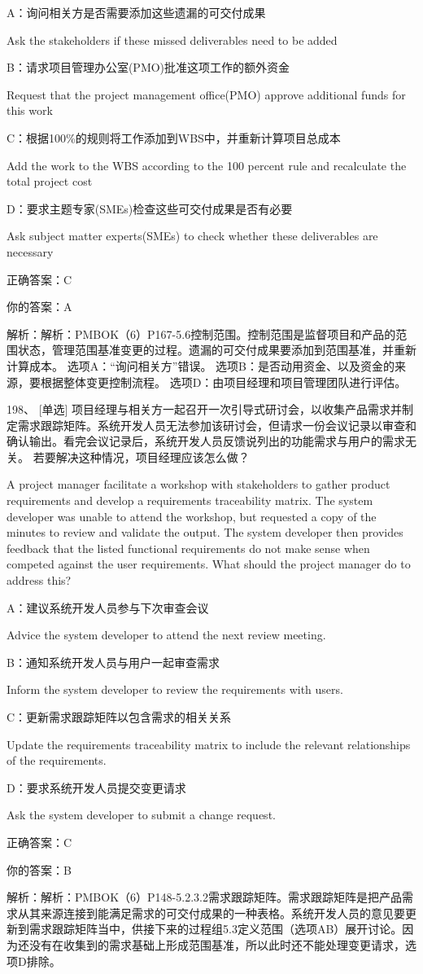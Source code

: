 A：询问相关方是否需要添加这些遗漏的可交付成果

Ask the stakeholders if these missed deliverables need to be added

B：请求项目管理办公室(PMO)批准这项工作的额外资金

Request that the project management office(PMO) approve additional funds for this work

C：根据100\%的规则将工作添加到WBS中，并重新计算项目总成本

Add the work to the WBS according to the 100 percent rule and recalculate the total project cost

D：要求主题专家(SMEs)检查这些可交付成果是否有必要

Ask subject matter experts(SMEs) to check whether these deliverables are necessary

正确答案：C

你的答案：A

解析：解析：PMBOK（6）P167-5.6控制范围。控制范围是监督项目和产品的范围状态，管理范围基准变更的过程。遗漏的可交付成果要添加到范围基准，并重新计算成本。 选项A：“询问相关方”错误。 选项B：是否动用资金、以及资金的来源，要根据整体变更控制流程。 选项D：由项目经理和项目管理团队进行评估。


198、 [单选] 项目经理与相关方一起召开一次引导式研讨会，以收集产品需求并制定需求跟踪矩阵。系统开发人员无法参加该研讨会，但请求一份会议记录以审查和确认输出。看完会议记录后，系统开发人员反馈说列出的功能需求与用户的需求无关。 若要解决这种情况，项目经理应该怎么做？

A project manager facilitate a workshop with stakeholders to gather product requirements and develop a requirements traceability matrix. The system developer was unable to attend the workshop, but requested a copy of the minutes to review and validate the output. The system developer then provides feedback that the listed functional requirements do not make sense when competed against the user requirements. What should the project manager do to address this?

A：建议系统开发人员参与下次审查会议

Advice the system developer to attend the next review meeting.

B：通知系统开发人员与用户一起审查需求

Inform the system developer to review the requirements with users.

C：更新需求跟踪矩阵以包含需求的相关关系

Update the requirements traceability matrix to include the relevant relationships of the requirements.

D：要求系统开发人员提交变更请求

Ask the system developer to submit a change request.

正确答案：C

你的答案：B

解析：解析：PMBOK（6）P148-5.2.3.2需求跟踪矩阵。需求跟踪矩阵是把产品需求从其来源连接到能满足需求的可交付成果的一种表格。系统开发人员的意见要更新到需求跟踪矩阵当中，供接下来的过程组5.3定义范围（选项AB）展开讨论。因为还没有在收集到的需求基础上形成范围基准，所以此时还不能处理变更请求，选项D排除。

